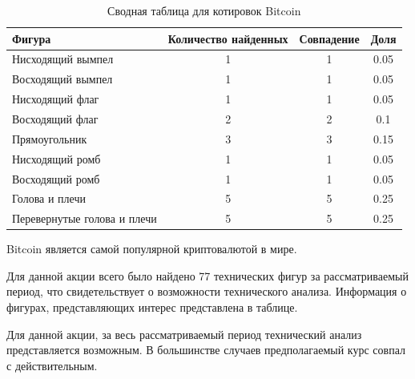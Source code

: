 \documentclass[bachelor, och, coursework]{SCWorks}
\begin{document}
        \begin{table}[!hbt]
            \centering
            \begin{tabular}{|l|c|c|c|}
            \hline
            Фигура                      & \multicolumn{1}{l|}{Количество найденных} & Совпадение & Доля  \\ \hline
            Нисходящий вымпел           & 1                                         & 1          & 0.05 \\ \hline
            Восходящий вымпел           & 1                                         & 1          & 0.05 \\ \hline
            Нисходящий флаг             & 1                                         & 1          & 0.05 \\ \hline
            Восходящий флаг             & 2                                         & 2          & 0.1 \\ \hline
            Прямоугольник               & 3                                         & 3          & 0.15 \\ \hline
            Нисходящий ромб             & 1                                         & 1          & 0.05 \\ \hline
            Восходящий ромб             & 1                                         & 1          & 0.05 \\ \hline
            Голова и плечи              & 5                                         & 5          & 0.25 \\ \hline
            Перевернутые голова и плечи & 5                                         & 5          & 0.25 \\ \hline
            \end{tabular}
            \captionsetup{justification=centering}
            \caption{Сводная таблица для котировок Bitcoin}     
        \end{table}
        
        Bitcoin является самой популярной криптовалютой в мире.

        Для данной акции всего было найдено 77 технических фигур за 
        рассматриваемый период, что свидетельствует о возможности технического 
        анализа. Информация о фигурах, представляющих интерес представлена в 
        таблице.
        
        Для данной акции, за весь рассматриваемый период технический анализ 
        представляется возможным. В большинстве случаев предполагаемый курс 
        совпал с действительным.
        
\end{document}

